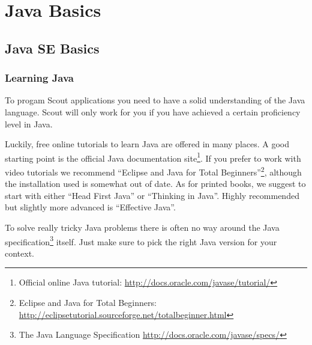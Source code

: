 \documentclass[a4paper,10pt,twoside]{book}
\begin{document}
  \sloppy
\fi


\chapter{Java Basics}

\section{Java SE Basics}


\subsection{Learning Java}

To progam Scout applications you need to have a solid understanding of the Java language.
Scout will only work for you if you have achieved a certain proficiency level in Java. 

Luckily, free online tutorials to learn Java are offered in many places.
A good starting point is the official Java documentation 
site\footnote{Official online Java tutorial: \url{http://docs.oracle.com/javase/tutorial/}}.
If you prefer to work with video tutorials we recommend ``Eclipse and Java for Total 
Beginners''\footnote{Eclipse and Java for Total Beginners: \url{http://eclipsetutorial.sourceforge.net/totalbeginner.html}}, 
although the installation used is somewhat out of date.
As for printed books, we suggest to start with either ``Head First Java''\cite{batessierra05} or ``Thinking in Java''\cite{eckel06}.
Highly recommended but slightly more advanced is ``Effective Java''\cite{bloch08}.

To solve really tricky Java problems there is often no way around the Java 
specification\footnote{The Java Language Specification \url{http://docs.oracle.com/javase/specs/}} itself.
Just make sure to pick the right Java version for your context.
\end{document}
